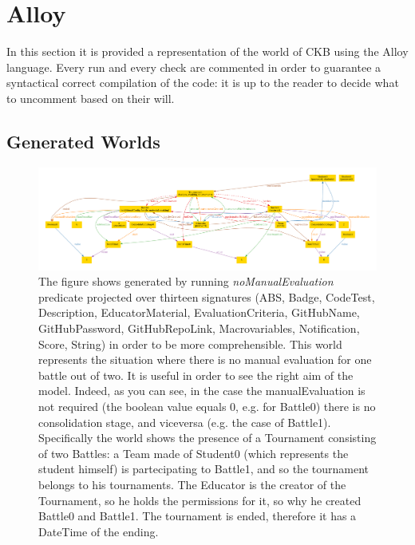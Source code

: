 \section{Alloy}
\lstset{
  language=alloy,
  basicstyle=\small\ttfamily,
  breaklines=true,
  showstringspaces=false
}
In this section it is provided a representation of the world of CKB using the Alloy language. Every run and every check are commented in order to guarantee a syntactical correct compilation of the code: it is up to the reader to decide what to uncomment based on their will.



\subsection{Generated Worlds}
\begin{figure}[h]
  \centering
  \includegraphics[width=1\linewidth]{RASD/4Alloy/res/noManualEvaluation.pdf}
  \caption{The figure shows generated by running \textit{noManualEvaluation} predicate projected over thirteen signatures (ABS, Badge, CodeTest, Description, EducatorMaterial, EvaluationCriteria, GitHubName, GitHubPassword, GitHubRepoLink, Macrovariables, Notification, Score, String) in order to be more comprehensible. This world represents the situation where there is no manual evaluation for one battle out of two. It is useful in order to see the right aim of the model. Indeed, as you can see, in the case the manualEvaluation is not required (the boolean value equals 0, e.g. for Battle0) there is no consolidation stage, and viceversa (e.g. the case of Battle1). Specifically the world shows the presence of a Tournament consisting of two Battles: a Team made of Student0 (which represents the student himself) is partecipating to Battle1, and so the tournament belongs to his tournaments. The Educator is the creator of the Tournament, so he holds the permissions for it, so why he created Battle0 and Battle1. The tournament is ended, therefore it has a DateTime of the ending. }
\end{figure}

